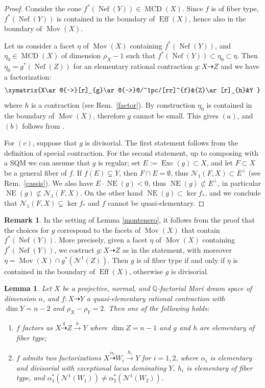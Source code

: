 \documentclass[a4paper,12pt]{amsart}
\newtheorem{lemma}[thm]{Lemma}
\theoremstyle{definition}
\newtheorem{remark}[thm]{Remark}
\numberwithin{figure}{section}
\numberwithin{table}{section}
\newcommand{\Q}{\mathbb{Q}}
\newcommand{\N}{\mathcal{N}_1}
\newcommand{\Nu}{\mathcal{N}^1}
\newcommand{\NE}{\operatorname{NE}}
\newcommand{\Exc}{\operatorname{Exc}}
\newcommand{\Eff}{\operatorname{Eff}}
\newcommand{\Nef}{\operatorname{Nef}}
\newcommand{\Mov}{\operatorname{Mov}}
\newcommand{\MCD}{\operatorname{MCD}}
\begin{document}
\begin{proof}
Consider the cone $f^*(\Nef(Y))\in\MCD(X)$.
Since $f$ is of fiber type, $f^*(\Nef(Y))$ is contained in the boundary of $\Eff(X)$, hence also in the boundary of $\Mov(X)$.

Let us 
  consider a facet $\eta$ of $\Mov(X)$ containing $f^*(\Nef(Y))$,
and
$\eta_0\in\MCD(X)$ of dimension $\rho_X-1$ such that $f^*(\Nef(Y))\subset\eta_0\subset\eta$.
Then $\eta_0=g^*(\Nef(Z))$ for an elementary rational contraction $g\colon X\dasharrow Z$ and we have a factorization:
$$\xymatrix{X\ar@{-->}[r]_{g}\ar@{-->}@/^1pc/[rr]^{f}&{Z}\ar[r]_{h}&Y
    }$$
    where $h$ is a contraction (see Rem.~\ref{factor}).
By construction $\eta_0$ is contained in the boundary of $\Mov(X)$, therefore $g$ cannot be small. This gives $(a)$, and $(b)$ follows from \cite[Prop.~2.10]{fibrations}.

For $(c)$, suppose that $g$ is divisorial. The first statement follows from the definition of special contraction. For the second statement,
up to composing with a SQM we can assume that $g$ is regular; set $E:=\Exc(g)\subset X$, and let $F\subset  X$ be a general fiber of $f$.
If $f(E)\subsetneq Y$, then $F\cap E=\emptyset$, thus $\N(F,X)\subset E^{\perp}$ (see Rem.~\ref{cassis}). We also have $E\cdot \NE(g)<0$, thus $\NE(g) \not\subset E^{\perp}$, in particular $\NE(g)\not\subset\N(F,X)$. On the other hand $\NE(g)\subset\ker f_*$, and we conclude that $\N(F,X)\subsetneq\ker f_*$ and $f$ cannot be quasi-elementary.
\end{proof}
\begin{remark}\label{choices}
In the setting of Lemma \ref{montenero}, it follows from the proof
  that the choices for $g$ correspond to the facets of $\Mov(X)$ that contain $f^*(\Nef(Y))$. More precisely, given a facet $\eta$ of $\Mov(X)$ containing 
$f^*(\Nef(Y))$, we costruct $g\colon X\dasharrow Z$ as in the statement, with moreover $\eta=\Mov(X)\cap g^*(\Nu(Z))$. Then $g$ is of fiber type if and only if $\eta$ is contained in the boundary of $\Eff(X)$, otherwise $g$ is divisorial.
\end{remark}
\begin{lemma}\label{quasiel2}
  Let $X$ be a projective, normal, and $\Q$-factorial Mori dream space of dimension $n$, and $f\colon X\dasharrow Y$ a quasi-elementary rational contraction
  with $\dim Y=n-2$ and $\rho_X-\rho_Y=2$.
  Then one of the following holds:
  \begin{enumerate}[$(i)$]
    \item
      $f$ factors as $X\stackrel{g}{\dasharrow}Z\stackrel{h}{\to} Y$ where $\dim Z=n-1$ and $g$ and $h$ are elementary of fiber type;
    \item
      $f$ admits two factorizations 
 $X\stackrel{\alpha_i}{\dasharrow}W_i\stackrel{h_i}{\to}Y$ for $i=1,2$,
 where $\alpha_i$ is elementary and divisorial with exceptional locus dominating $Y$, $h_i$ is elementary of fiber type, and $\alpha_1^*(\Nu(W_1))\neq\alpha_2^*(\Nu(W_2))$.
 \end{enumerate}
\end{lemma}
\end{document}
